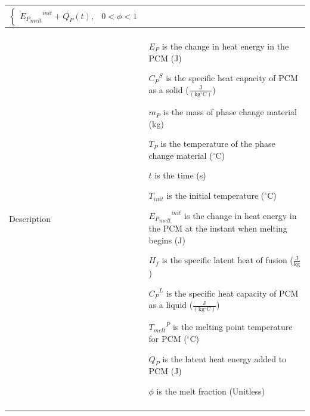 \documentclass[12pt]{article}
\begin{document}
\begin{minipage}{\textwidth}
\begin{tabular}{p{} p{}}
\begin{displaymath}
\begin{cases}
{{{E_{P}}_{melt}}^{init}}+{Q_{P}}\left(t\right), & 0<ϕ<1
\end{cases}
           \end{displaymath}
\\ \midrule \\
Description & \begin{symbDescription}
              \item{${E_{P}}$ is the change in heat energy in the PCM (J)}
              \item{${{C_{P}}^{S}}$ is the specific heat capacity of PCM as a solid ($\frac{\text{J}}{(\text{kg}{}^{\circ}\text{C})}$)}
              \item{${m_{P}}$ is the mass of phase change material (kg)}
              \item{${T_{P}}$ is the temperature of the phase change material (${}^{\circ}$C)}
              \item{$t$ is the time (s)}
              \item{${T_{init}}$ is the initial temperature (${}^{\circ}$C)}
              \item{${{{E_{P}}_{melt}}^{init}}$ is the change in heat energy in the PCM at the instant when melting begins (J)}
              \item{${H_{f}}$ is the specific latent heat of fusion ($\frac{\text{J}}{\text{kg}}$)}
              \item{${{C_{P}}^{L}}$ is the specific heat capacity of PCM as a liquid ($\frac{\text{J}}{(\text{kg}{}^{\circ}\text{C})}$)}
              \item{${{T_{melt}}^{P}}$ is the melting point temperature for PCM (${}^{\circ}$C)}
              \item{${Q_{P}}$ is the latent heat energy added to PCM (J)}
              \item{$ϕ$ is the melt fraction (Unitless)}
              \end{symbDescription}
\\ \midrule \\

\end{tabular}
\end{minipage}
\end{document}
